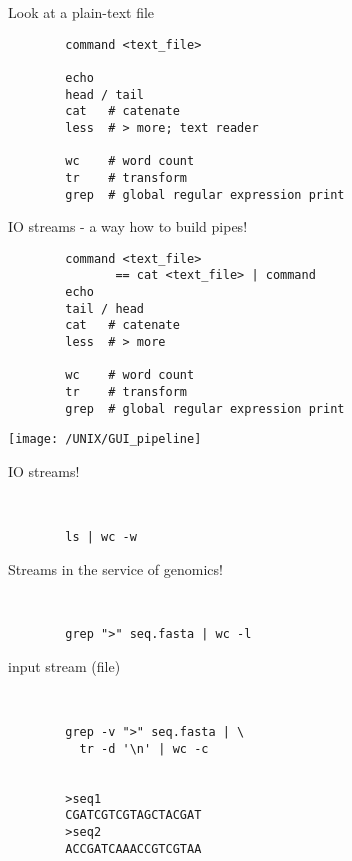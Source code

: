 \documentclass[xcolor=dvipsnames]{beamer}
\begin{document}
\begin{frame}[fragile]
	\huge
	Look at a plain-text file
	\Large
	\begin{verbatim}
		command <text_file>

		echo
		head / tail
		cat   # catenate
		less  # > more; text reader

		wc    # word count
		tr    # transform
		grep  # global regular expression print
	\end{verbatim}
\end{frame}

\begin{frame}[fragile]
	\huge
	IO streams - a way how to build pipes!
	\Large
	\begin{verbatim}
		command <text_file>
	           == cat <text_file> | command
		echo
		tail / head
		cat   # catenate
		less  # > more

		wc    # word count
		tr    # transform
		grep  # global regular expression print
	\end{verbatim}
\end{frame}

\begin{frame}
	\begin{center}
		\texttt{[image: /UNIX/GUI\_pipeline]}
	\end{center}
\end{frame}

\begin{frame}[fragile]
	\huge
	IO streams!
	\Large
	\begin{verbatim}


		ls | wc -w
	\end{verbatim}
\end{frame}

\begin{frame}[fragile]
	\huge
	Streams in the service of genomics!
	\Large
	\begin{verbatim}


		grep ">" seq.fasta | wc -l
	\end{verbatim}
\end{frame}

\begin{frame}[fragile]
	\huge
	input stream (file)
	\Large
	\begin{verbatim}


		grep -v ">" seq.fasta | \
		  tr -d '\n' | wc -c


		>seq1
		CGATCGTCGTAGCTACGAT
		>seq2
		ACCGATCAAACCGTCGTAA
	\end{verbatim}
\end{frame}
\end{document}
